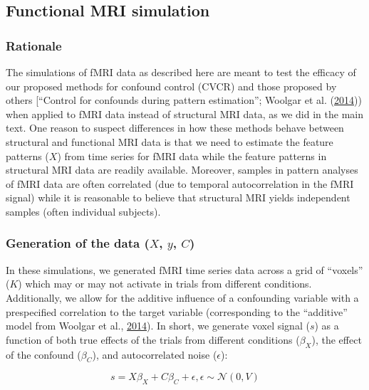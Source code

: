\documentclass[11pt,american,]{memoir} %
\begin{document}
\hypertarget{functional-mri-simulation}{%
\subsection{Functional MRI simulation}\label{functional-mri-simulation}}

\hypertarget{rationale}{%
\subsubsection{Rationale}\label{rationale}}

The simulations of fMRI data as described here are meant to test the efficacy of our proposed methods for confound control (CVCR) and those proposed by others {[}``Control for confounds during pattern estimation''; Woolgar et al. (\protect\hyperlink{ref-Woolgar2014-jb}{2014})) when applied to fMRI data instead of structural MRI data, as we did in the main text. One reason to suspect differences in how these methods behave between structural and functional MRI data is that we need to estimate the feature patterns (\(X\)) from time series for fMRI data while the feature patterns in structural MRI data are readily available. Moreover, samples in pattern analyses of fMRI data are often correlated (due to temporal autocorrelation in the fMRI signal) while it is reasonable to believe that structural MRI yields independent samples (often individual subjects).

\hypertarget{generation-of-the-data-x-y-c}{%
\subsubsection{\texorpdfstring{Generation of the data (\(X\), \(y\), \(C\))}{Generation of the data (X, y, C)}}\label{generation-of-the-data-x-y-c}}

In these simulations, we generated fMRI time series data across a grid of ``voxels'' (\(K\)) which may or may not activate in trials from different conditions. Additionally, we allow for the additive influence of a confounding variable with a prespecified correlation to the target variable (corresponding to the ``additive'' model from Woolgar et al., \protect\hyperlink{ref-Woolgar2014-jb}{2014}). In short, we generate voxel signal (\(s\)) as a function of both true effects of the trials from different conditions (\(\beta_{X}\)), the effect of the confound (\(\beta_{C}\)), and autocorrelated noise (\(\epsilon\)):

\begin{equation}
s = X\beta_{X} + C\beta_{C} + \epsilon, \epsilon \sim \mathcal{N}(0, V)
\end{equation}
\end{document}
